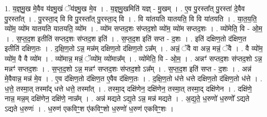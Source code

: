 \documentclass[17pt]{extarticle}
\begin{document}
1. य॒ज्ञ्॒मु॒ख मे॒वैव य॑ज्ञ्मु॒खं ॅय॑ज्ञ्मु॒ख मे॒व । . य॒ज्ञ्॒मु॒खमिति॑ यज्ञ् - मु॒खम् । . ए॒व पु॒रस्ता᳚त् पु॒रस्ता॑ दे॒वैव पु॒रस्ता᳚त् । . पु॒रस्ता॒द् वि वि पु॒रस्ता᳚त् पु॒रस्ता॒द् वि । . वि या॑तयति यातयति॒ वि वि या॑तयति । . या॒त॒य॒ति॒ व्यो॑म॒ व्यो॑म यातयति यातयति॒ व्यो॑म । . व्यो॑म सप्तद॒शः स॑प्तद॒शो व्यो॑म॒ व्यो॑म सप्तद॒शः । . व्यो॑मेति॒ वि - ओ॒म॒ । . स॒प्त॒द॒श इतीति॑ सप्तद॒शः स॑प्तद॒श इति॑ । . स॒प्त॒द॒श इति॑ सप्त - द॒शः । . इति॑ दक्षिण॒तो द॑क्षिण॒त इतीति॑ दक्षिण॒तः । . द॒क्षि॒ण॒तो ऽन्न॒ मन्न॑म् दक्षिण॒तो द॑क्षिण॒तो ऽन्न᳚म् । . अन्नं॒ ॅवै वा अन्न॒ मन्नं॒ ॅवै । . वै व्यो॑म॒ व्यो॑म॒ वै वै व्यो॑म । . व्यो॑मान्न॒ मन्नं॒ ॅव्यो॑म॒ व्यो॑मान्न᳚म् । . व्यो॑मेति॒ वि - ओ॒म॒ । . अन्नꣳ॑ सप्तद॒शः स॑प्तद॒शो ऽन्न॒ मन्नꣳ॑ सप्तद॒शः । . स॒प्त॒द॒शो ऽन्न॒ मन्नꣳ॑ सप्तद॒शः स॑प्तद॒शो ऽन्न᳚म् । . स॒प्त॒द॒श इति॑ सप्त - द॒शः । . अन्न॑ मे॒वैवान्न॒ मन्न॑ मे॒व । . ए॒व द॑क्षिण॒तो द॑क्षिण॒त ए॒वैव द॑क्षिण॒तः । . द॒क्षि॒ण॒तो ध॑त्ते धत्ते दक्षिण॒तो द॑क्षिण॒तो ध॑त्ते । . ध॒त्ते॒ तस्मा॒त् तस्मा᳚द् धत्ते धत्ते॒ तस्मा᳚त् । . तस्मा॒द् दक्षि॑णेन॒ दक्षि॑णेन॒ तस्मा॒त् तस्मा॒द् दक्षि॑णेन । . दक्षि॑णे॒ नान्न॒ मन्न॒म् दक्षि॑णेन॒ दक्षि॑णे॒ नान्न᳚म् । . अन्न॑ मद्यते ऽद्य॒ते ऽन्न॒ मन्न॑ मद्यते । . अ॒द्य॒ते॒ ध॒रुणो॑ ध॒रुणो᳚ ऽद्यते ऽद्यते ध॒रुणः॑ । . ध॒रुण॑ एकविꣳ॒॒श ए॑कविꣳ॒॒शो ध॒रुणो॑ ध॒रुण॑ एकविꣳ॒॒शः । \newline
\end{document}
